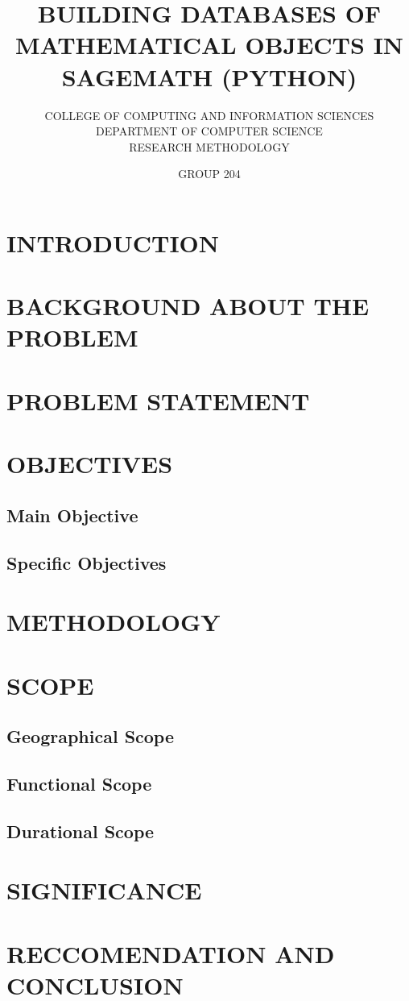 \documentclass[11pt]{Concept Paper}
\title{\textbf{BUILDING DATABASES OF MATHEMATICAL OBJECTS IN SAGEMATH (PYTHON)}}
\author{COLLEGE OF COMPUTING AND INFORMATION SCIENCES\\DEPARTMENT OF COMPUTER SCIENCE\\RESEARCH METHODOLOGY}
\author{GROUP 204}
\begin{document}
\maketitle

\section{INTRODUCTION}

\section{BACKGROUND ABOUT THE PROBLEM}

\section{PROBLEM STATEMENT}

\section{OBJECTIVES}
\subsection{Main Objective}


\subsection{Specific Objectives}


\section{METHODOLOGY}

\section{SCOPE}
\subsection{Geographical Scope}


\subsection{Functional Scope}


\subsection{Durational Scope}


\section{SIGNIFICANCE}


\section{RECCOMENDATION AND CONCLUSION}
\end{document}

